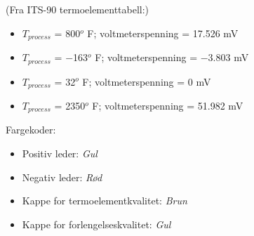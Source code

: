 





(Fra ITS-90 termoelementtabell:)

\begin{itemize}
\item{} $T_{process}$ = 800$^{o}$ F; voltmeterspenning = 17.526 mV
\item{} $T_{process}$ = $-$163$^{o}$ F; voltmeterspenning = $-$3.803 mV
\item{} $T_{process}$ = 32$^{o}$ F; voltmeterspenning = 0 mV
\item{} $T_{process}$ = 2350$^{o}$ F; voltmeterspenning = 51.982 mV
\end{itemize}

\vskip 10pt

Fargekoder:

\begin{itemize}
\item{} Positiv leder: {\it Gul}
\item{} Negativ leder: {\it Rød}
\item{} Kappe for termoelementkvalitet: {\it Brun}
\item{} Kappe for forlengelseskvalitet: {\it Gul}
\end{itemize}


